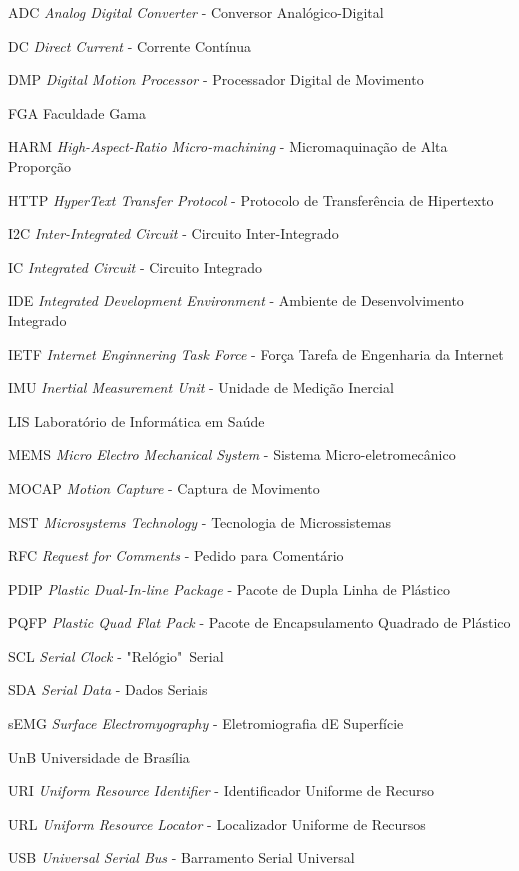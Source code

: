 \begin{siglas}

   \item[ADC]	\textit{Analog Digital Converter} - Conversor Analógico-Digital					
   \item[DC]	\textit{Direct Current} - Corrente Contínua						
   \item[DMP]	\textit{Digital Motion Processor} -	Processador	Digital	de Movimento													
   \item[FGA]	Faculdade Gama									
   \item[HARM]	\textit{High-Aspect-Ratio Micro-machining} - Micromaquinação de Alta Proporção	
   \item [HTTP] \textit{HyperText Transfer Protocol} - Protocolo de Transferência de Hipertexto
   \item[I2C]	\textit{Inter-Integrated Circuit} -	Circuito Inter-Integrado						
   \item[IC]	\textit{Integrated	Circuit} - Circuito	Integrado						
   \item[IDE]	\textit{Integrated	Development	Environment} - Ambiente	de Desenvolvimento Integrado	
   \item [IETF] \textit{Internet Enginnering Task Force} - Força Tarefa de Engenharia da Internet
   \item[IMU]	\textit{Inertial Measurement Unit} - Unidade de	Medição	Inercial			
   \item[LIS]	Laboratório	de Informática em Saúde						
   \item[MEMS]	\textit{Micro Electro Mechanical System} - Sistema Micro-eletromecânico				
   \item[MOCAP]	\textit{Motion Capture} - Captura	de Movimento					
   \item[MST]	\textit{Microsystems Technology} - Tecnologia de Microssistemas				
   \item [RFC] \textit{Request for Comments} - Pedido para Comentário	
   \item[PDIP]	\textit{Plastic Dual-In-line Package} - Pacote de Dupla Linha de Plástico	
   \item[PQFP]	\textit{Plastic	Quad Flat Pack} - Pacote de	Encapsulamento Quadrado de Plástico
   \item[SCL]	\textit{Serial Clock} -	"Relógio"\ Serial						
   \item[SDA]	\textit{Serial Data} - Dados Seriais
   \item[sEMG]	\textit{Surface Electromyography} - Eletromiografia dE Superfície					
   \item[UnB]	Universidade de	Brasília				
   \item [URI] 	\textit{Uniform Resource Identifier} - Identificador Uniforme de Recurso	
   \item [URL] \textit{Uniform Resource Locator} - Localizador Uniforme de Recursos
   \item[USB]	\textit{Universal Serial Bus} -	Barramento Serial Universal				
   
\end{siglas}
